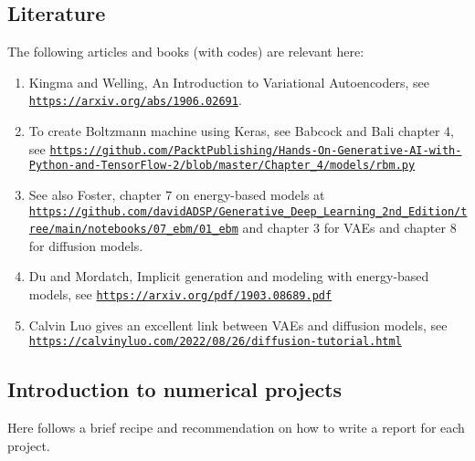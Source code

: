 \documentclass[%
oneside,                 %
final,                   %
10pt]{article}
\begin{document}
\noindent
\subsection*{Literature}

The following articles and books (with codes) are relevant here:

\begin{enumerate}
\item Kingma and Welling, An Introduction to Variational Autoencoders, see \href{{https://arxiv.org/abs/1906.02691}}{\nolinkurl{https://arxiv.org/abs/1906.02691}}.

\item To create Boltzmann machine using Keras, see Babcock and Bali chapter 4, see \href{{https://github.com/PacktPublishing/Hands-On-Generative-AI-with-Python-and-TensorFlow-2/blob/master/Chapter_4/models/rbm.py}}{\nolinkurl{https://github.com/PacktPublishing/Hands-On-Generative-AI-with-Python-and-TensorFlow-2/blob/master/Chapter_4/models/rbm.py}}

\item See also Foster, chapter 7 on energy-based models at \href{{https://github.com/davidADSP/Generative_Deep_Learning_2nd_Edition/tree/main/notebooks/07_ebm/01_ebm}}{\nolinkurl{https://github.com/davidADSP/Generative_Deep_Learning_2nd_Edition/tree/main/notebooks/07_ebm/01_ebm}} and chapter 3 for VAEs and chapter 8 for diffusion models.

\item Du and Mordatch, Implicit generation and modeling with energy-based models, see \href{{https://arxiv.org/pdf/1903.08689.pdf}}{\nolinkurl{https://arxiv.org/pdf/1903.08689.pdf}}

\item Calvin Luo gives an excellent link between VAEs and diffusion models, see \href{{https://calvinyluo.com/2022/08/26/diffusion-tutorial.html}}{\nolinkurl{https://calvinyluo.com/2022/08/26/diffusion-tutorial.html}}
\end{enumerate}

\noindent
\subsection*{Introduction to numerical projects}

Here follows a brief recipe and recommendation on how to write a report for each
project.
\end{document}
